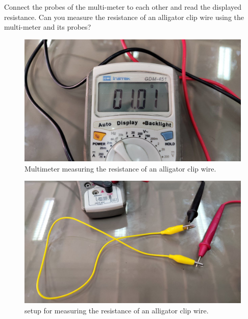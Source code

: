 \documentclass[11pt]{article}
\newcommand{\PicScale}{0.2}
\begin{document}
\begin{question}
\begin{subquestion}{Connect the probes of the multi-meter to each other and read the displayed resistance. Can you measure the resistance of an alligator clip wire using the multi-meter and its probes? }
{            \begin{figure}[H]
                \begin{center}
                    \includegraphics[scale=\PicScale]{Fig/53.jpeg}
                    \caption{Multimeter measuring the resistance of an alligator clip wire.}
                \end{center}
            \end{figure}

            \begin{figure}[H]
                \begin{center}
                    \includegraphics[scale=\PicScale]{Fig/54.jpeg}
                    \caption{setup for measuring the resistance of an alligator clip wire.}
                \end{center}
            \end{figure}

        }
    \end{subquestion}

\end{question}


\end{document}

